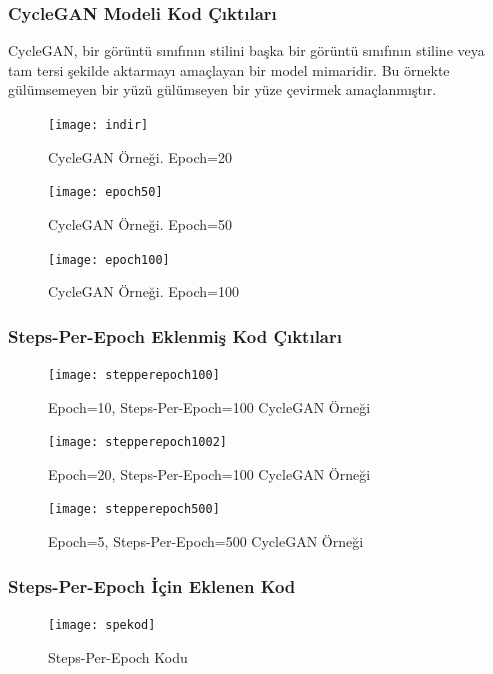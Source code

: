 \documentclass[12pt, a4paper]{article}
\begin{document}
	\subsubsection{CycleGAN Modeli Kod Çıktıları}
	CycleGAN, bir görüntü sınıfının stilini başka bir görüntü sınıfının stiline veya tam tersi şekilde aktarmayı amaçlayan bir model mimaridir. Bu örnekte gülümsemeyen bir yüzü gülümseyen bir yüze çevirmek amaçlanmıştır.
	\begin{figure}[h]
		\centering
		\texttt{[image: indir]}
		\label{indir}
		\caption{CycleGAN Örneği. Epoch=20\cite{Introduction-2024-05-22}}
	\end{figure}
	\clearpage
	
	\begin{figure}[h]
		\centering
		\texttt{[image: epoch50]}
		\label{epoch50}
		\caption{CycleGAN Örneği. Epoch=50\cite{Introduction-2024-05-22}}
	\end{figure}	
	\clearpage
	
	\begin{figure}[h]
		\centering
		\texttt{[image: epoch100]}
		\label{epoch100}
		\caption{CycleGAN Örneği. Epoch=100\cite{Introduction-2024-05-22}}
	\end{figure}
	
	
	\FloatBarrier
	
	\clearpage
	\subsubsection{Steps-Per-Epoch Eklenmiş Kod Çıktıları}
	
	\begin{figure}[h]
		\centering
		\texttt{[image: stepperepoch100]}
		\label{stepperepoch100}
		\caption{Epoch=10, Steps-Per-Epoch=100 CycleGAN Örneği }
	\end{figure}	
	\FloatBarrier
	\clearpage
	
	\begin{figure}[h]
		\centering
		\texttt{[image: stepperepoch1002]}
		\label{stepperepoch1002}
		\caption{Epoch=20, Steps-Per-Epoch=100 CycleGAN Örneği }
	\end{figure}	
	\clearpage
	
	\begin{figure}[h]
		\centering
		\texttt{[image: stepperepoch500]}
		\label{stepperepoch500}
		\caption{Epoch=5, Steps-Per-Epoch=500 CycleGAN Örneği}
	\end{figure}	
	\FloatBarrier
	\clearpage
	\subsubsection{Steps-Per-Epoch İçin Eklenen Kod}
	\begin{figure}[h]
		\centering
		\texttt{[image: spekod]}
		\label{spekod}
		\caption{Steps-Per-Epoch Kodu\cite{ChatGPT-2024-05-29}}
	\end{figure}	
	\FloatBarrier
\end{document}
